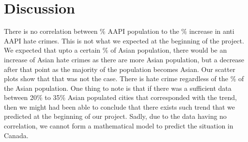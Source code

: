 \documentclass[fontsize=11pt]{article}
\begin{document}
\section*{Discussion}

\quad There is no correlation between \% AAPI population to the \% increase in anti AAPI hate crimes. This is not what we expected at the beginning of the project. We expected that upto a certain \% of Asian population, there would be an increase of Asian hate crimes as there are more Asian population, but a decrease after that point as the majority of the population becomes Asian. Our scatter plots show that that was not the case. There is hate crime regardless of the \% of the Asian population. One thing to note is that if there was a sufficient data between 20\% to 35\% Asian populated cities that corresponded with the trend, then we might had been able to conclude that there exists such trend that we predicted at the beginning of our project. Sadly, due to the data having no correlation, we cannot form a mathematical model to predict the situation in Canada.
\\\\
\end{document}
